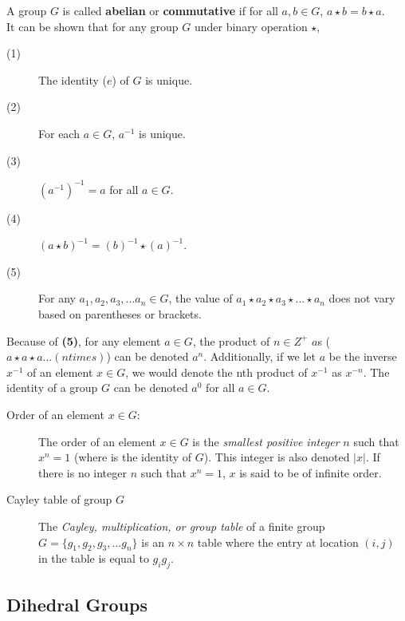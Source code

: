 \documentclass[12pt,letterpaper]{article}
\begin{document}
A group $G$ is called \textbf{abelian} or \textbf{commutative} if for all $a, b \in G$, $a \star b = b \star a$. \\

It can be shown that for any group $G$ under binary operation $\star$, 

\begin{description}
	\item[(1)] The identity ($e$) of $G$ is unique.
	\item[(2)] For each $a \in G$, $a^{-1}$ is unique.
	\item[(3)] $(a^{-1})^{-1} = a$ for all $a \in G$.
	\item[(4)] $(a \star b)^{-1} = (b)^{-1} \star (a)^{-1}$.
	\item[(5)] For any $a_{1}, a_{2}, a_{3}, ... a_{n} \in G$, the value of $a_{1} \star a_{2} \star a_{3} \star ... \star a_{n}$ does not vary based on parentheses or brackets.
\end{description}

Because of \textbf{(5)}, for any element $a \in G$, the product of $n \in Z^{+}$ $a$s ($a \star a \star a ... (n times)$) can be denoted $a^{n}$. Additionally, if we let $a$ be the inverse $x^{-1}$ of an element $x \in G$, we would denote the nth product of $x^{-1}$ as $x^{-n}$. The identity of a group $G$ can be denoted $a^{0}$ for all $a \in G$. 

\begin{description}
	\item[\boldmath Order of an element $x \in G$:] The order of an element $x \in G$ is the \textit{smallest positive integer} $n$ such that $x^{n} = 1$ (where is the identity of $G$). This integer is also denoted $|x|$. If there is no integer $n$ such that $x^{n} = 1$, $x$ is said to be of infinite order.
\end{description}

\begin{description}
	\item[\boldmath Cayley table of group $G$] The \textit{Cayley, multiplication, or group table} of a finite group $G = \{g_{1}, g_{2}, g_{3}, ... g_{n}\}$ is an $n \times n$ table where the entry at location $(i, j)$ in the table is equal to $g_{i}g_{j}$.
\end{description}

\subsection{Dihedral Groups}
\end{document}
